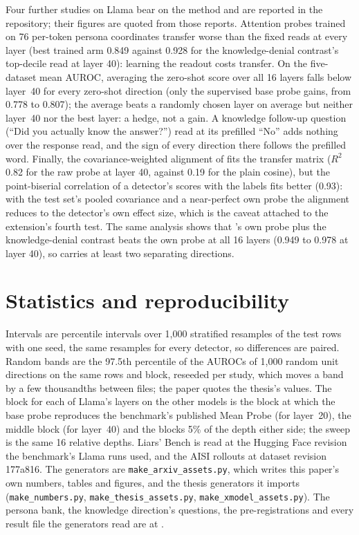 Four further studies on Llama bear on the method and are reported in the repository; their figures are
quoted from those reports. Attention probes trained on 76 per-token persona coordinates transfer worse
than the fixed reads at every layer (best trained arm 0.849 against 0.928 for the knowledge-denial
contrast's top-decile read at layer 40): learning the readout costs transfer. On the five-dataset mean AUROC,
averaging the zero-shot score over all 16 layers falls below layer~40 for every zero-shot direction (only
the supervised base probe gains, from 0.778 to 0.807); the average beats a randomly chosen layer on average
but neither layer~40 nor the best layer: a hedge, not a gain. A knowledge
follow-up question (``Did you actually know the answer?'') read at its prefilled ``No'' adds nothing over
the response read, and the sign of every direction there follows the prefilled word. Finally, the
covariance-weighted alignment of \citet{ying2026truthfulness} fits the transfer matrix ($R^2$ 0.82 for
the raw probe at layer 40, against 0.19 for the plain cosine), but the point-biserial correlation of a
detector's scores with the labels fits better (0.93): with the test set's pooled covariance and a
near-perfect own probe the alignment reduces to the detector's own effect size, which is the caveat
attached to the extension's fourth test. The same analysis shows that \hpkr's own probe plus the
knowledge-denial contrast beats the own probe at all 16 layers (0.949 to 0.978 at layer 40), so \hpkr{}
carries at least two separating directions.

\FloatBarrier
\section{Statistics and reproducibility}
\label{app:repro}

Intervals are percentile intervals over 1,000 stratified resamples of the test rows with one seed, the
same resamples for every detector, so differences are paired. Random bands are the 97.5th percentile of
the AUROCs of 1,000 random unit directions on the same rows and block, reseeded per study, which moves a
band by a few thousandths between files; the paper quotes the thesis's values. The block for each of
Llama's layers on the other models is the block at which the base probe reproduces the benchmark's
published Mean Probe (for layer~20), the middle block (for layer~40) and the blocks 5\% of the depth either
side; the sweep is the same 16 relative depths. Liars' Bench is read at the Hugging Face revision the
benchmark's Llama runs used, and the AISI rollouts at dataset revision 177a816. The generators are
\texttt{make\_arxiv\_assets.py}, which writes this paper's own numbers, tables and figures, and the thesis
generators it imports (\texttt{make\_numbers.py}, \texttt{make\_thesis\_assets.py},
\texttt{make\_xmodel\_assets.py}). The persona bank, the knowledge direction's questions, the
pre-registrations and every result file the generators read are at \repourl.

